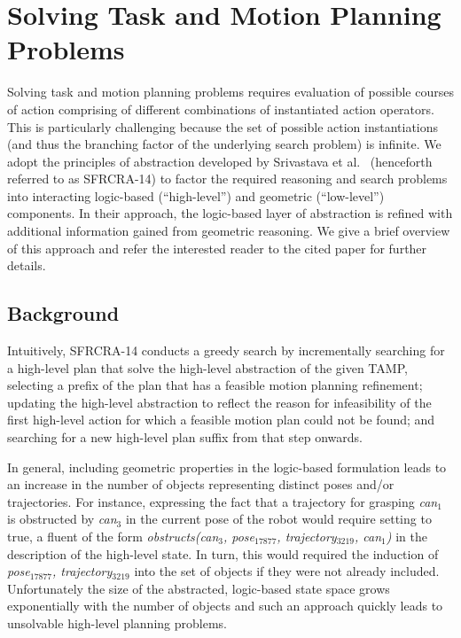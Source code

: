 \section{Solving Task and Motion Planning Problems}
Solving task and motion planning problems requires evaluation of
possible courses of action comprising of different combinations of
instantiated action operators. This is particularly challenging
because the set of possible action instantiations (and thus the
branching factor of the underlying search problem) is infinite.  We
adopt the principles of abstraction developed by Srivastava et
al.~\cite{srivastava2014combined} (henceforth referred to as SFRCRA-14)  to factor the required reasoning and
search problems into interacting logic-based (``high-level'') and
geometric (``low-level'') components. In their approach, the
logic-based layer of abstraction is refined with additional
information gained from geometric reasoning. We give a brief overview
of this approach and refer the interested reader to the cited paper
for further details.

\subsection{Background}
Intuitively, SFRCRA-14
conducts a greedy search by incrementally searching for a high-level
plan that solve the high-level abstraction of the given TAMP,
selecting a prefix of the plan that has a feasible motion planning
refinement; updating the high-level abstraction to reflect the
reason for infeasibility of the first high-level action for which a
feasible motion plan could not be found; and searching for a new
high-level plan suffix from that step onwards.

In general, including geometric properties in the logic-based
formulation leads to an increase in the number of objects representing
distinct poses and/or trajectories. For instance, expressing the fact
that a trajectory for grasping \emph{can$_1$} is obstructed by
\emph{can$_3$} in the current pose of the robot would require setting
to true, a fluent of the form \emph{obstructs(can$_3$, pose$_{17877}$,
  trajectory$_{3219}$, can$_1$)} in the description of the high-level
state. In turn, this would required the induction of
\emph{pose$_{17877}$, trajectory$_{3219}$} into the set of objects if
they were not already included. Unfortunately the size of the
abstracted, logic-based state space grows exponentially with the
number of objects and such an approach quickly leads to
unsolvable high-level planning problems.

